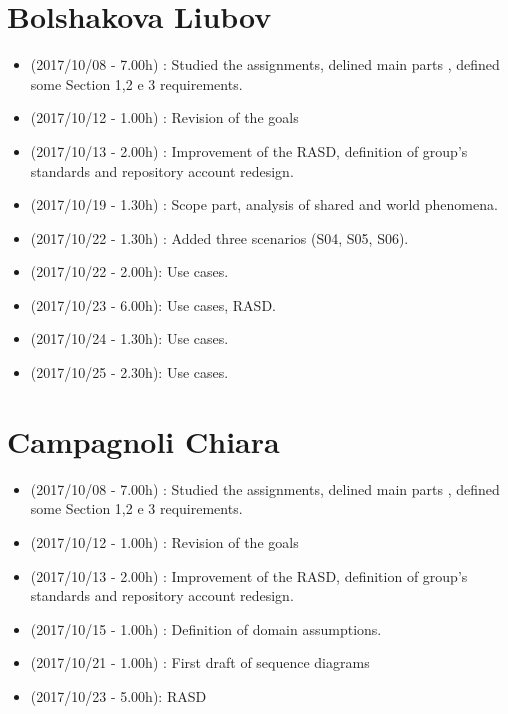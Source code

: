 \documentclass[a4paper,leqno]{book}
\begin{document}
\section{Bolshakova Liubov}
\begin{itemize}
\item (2017/10/08 - 7.00h) : Studied the assignments, delined main parts , defined some Section 1,2 e 3 requirements.
\item (2017/10/12 - 1.00h) : Revision of the goals 
\item (2017/10/13 - 2.00h) : Improvement of the RASD, definition of group's standards and repository account redesign.
\item (2017/10/19 - 1.30h) : Scope part, analysis of shared and world phenomena.
\item (2017/10/22 - 1.30h) : Added three scenarios (S04, S05, S06).
\item (2017/10/22 - 2.00h): Use cases.
\item (2017/10/23 - 6.00h): Use cases, RASD. 
\item (2017/10/24 - 1.30h): Use cases.
\item (2017/10/25 - 2.30h): Use cases.
\end{itemize}

\section{Campagnoli Chiara}
\begin{itemize}
\item (2017/10/08 - 7.00h) : Studied the assignments, delined main parts , defined some Section 1,2 e 3 requirements.
\item (2017/10/12 - 1.00h) : Revision of the goals 
\item (2017/10/13 - 2.00h) : Improvement of the RASD, definition of group's standards and repository account redesign.
\item (2017/10/15 - 1.00h) : Definition of domain assumptions.
\item (2017/10/21 - 1.00h) : First draft of sequence diagrams
\item (2017/10/23 - 5.00h): RASD
\end{itemize}
\end{document}
